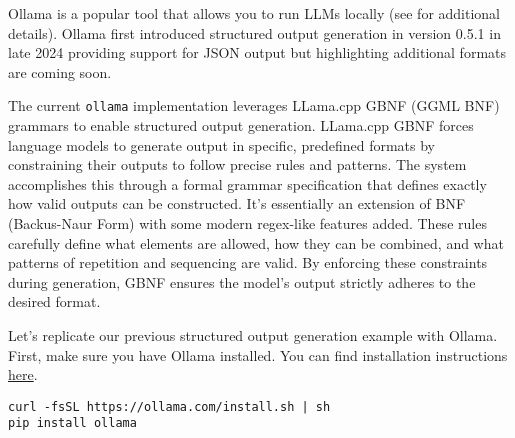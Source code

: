 Ollama \cite{ollama2024website} is a popular tool that allows you to run LLMs locally (see  for additional details). Ollama first introduced structured output generation in version 0.5.1 in late 2024 providing support for JSON output but highlighting additional formats are coming soon.

The current \texttt{ollama} implementation leverages LLama.cpp GBNF (GGML BNF) grammars  to enable structured output generation. LLama.cpp GBNF forces language models to generate output in specific, predefined formats by constraining their outputs to follow precise rules and patterns. The system accomplishes this through a formal grammar specification that defines exactly how valid outputs can be constructed. It's essentially an extension of BNF (Backus-Naur Form)  with some modern regex-like features added. These rules carefully define what elements are allowed, how they can be combined, and what patterns of repetition and sequencing are valid. By enforcing these constraints during generation, GBNF ensures the model's output strictly adheres to the desired format.

Let's replicate our previous structured output generation example with Ollama. First, make sure you have Ollama installed. You can find installation instructions \href{https://ollama.com/docs/installation}{here}.

\begin{verbatim}
curl -fsSL https://ollama.com/install.sh | sh
pip install ollama
\end{verbatim}

